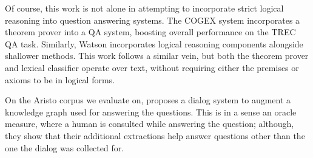 Of course, this work is not alone in attempting to incorporate
  strict logical reasoning into question answering systems.
The COGEX system \cite{key:2003moldovan-trec} incorporates a theorem
  prover into a QA system, boosting overall performance on the TREC
  QA task.
Similarly, Watson \cite{key:2010ferrucci-watson} incorporates
  logical reasoning components alongside shallower methods.
This work follows a similar vein, but both the theorem prover
  and lexical classifier operate over text, without requiring either
  the premises or axioms to be in logical forms.
  

On the Aristo corpus we evaluate on,  proposes
  a dialog system to augment a knowledge graph used for answering the questions.
This is in a sense an oracle measure, where a human is consulted while answering
  the question; although, they show that their additional extractions help
  answer questions other than the one the dialog was collected for.



